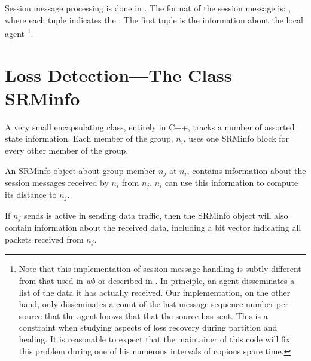 Session message processing is done in
.
The format of the session message is:
,
where each tuple indicates the
.
The first tuple is the information about the local agent%
\footnote{Note that this implementation of session message handling
  is subtly different from that used in \emph{wb} or described in
  \cite{Floy95:Reliable}.
  In principle, an agent disseminates a list of the data it has
  actually received.
  Our implementation, on the other hand, only disseminates
  a count of the last message sequence number per source that the
  agent knows that that the source has sent.
  This is a constraint when studying aspects of loss recovery
  during partition and healing.
  It is reasonable to expect that the maintainer of this code will fix
  this problem during one of his numerous intervals of copious spare time.}.

\section{Loss Detection---The Class SRMinfo}
\label{sec:srminfo}

A very small encapsulating class, entirely in C++,
tracks a number of assorted state information.
Each member of the group, $n_i$,  uses one SRMinfo block for every other
member of the group.

An SRMinfo object about group member $n_j$ at $n_i$,
contains information about the session messages
received by $n_i$ from $n_j$.
$n_i$ can use this information to compute its distance to $n_j$.

If $n_j$ sends is active in sending data traffic, then
the SRMinfo object will also contain information about the
received data, including a bit vector indicating all packets
received from $n_j$.

